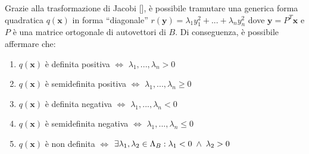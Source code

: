     Grazie alla trasformazione di Jacobi [], è possibile tramutare una generica forma quadratica $q(\mathbf{x})$ in forma ``diagonale'' $r(\mathbf{y}) = \lambda_1 y_{1}^{2} + ... + \lambda_n y_{n}^{2}$ dove $\mathbf{y} = P^{T} \mathbf{x}$ e $P$ è una matrice ortogonale di autovettori di $B$.
    Di conseguenza, è possibile affermare che:
    \begin{enumerate}[label=(\arabic*)]
        \item $q(\mathbf{x})$ è definita positiva $\iff$ $\lambda_1, ..., \lambda_n > 0$
        \item $q(\mathbf{x})$ è semidefinita positiva $\iff$ $\lambda_1, ..., \lambda_n \geq 0$
        \item $q(\mathbf{x})$ è definita negativa $\iff$ $\lambda_1, ..., \lambda_n < 0$
        \item $q(\mathbf{x})$ è semidefinita negativa $\iff$ $\lambda_1, ..., \lambda_n \leq 0$
        \item $q(\mathbf{x})$ è non definita $\iff$ $\exists \lambda_1, \lambda_2 \in \Lambda_B \mathrel{:} \lambda_1 < 0 \; \land \; \lambda_2 > 0$
    \end{enumerate}



\vspace{10pt}
